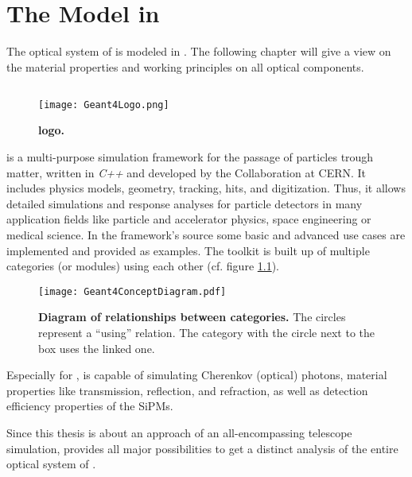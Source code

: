 \chapter{The \iceact Model in \geant}\label{chap:iceact_model}

The optical system of \iceact is modeled in \geant. The following chapter will give a view on the material properties and working principles on all optical components.

\section{\geant}

\begin{wrapfigure}{r}{0.5\textwidth}
	\centering
	\texttt{[image: Geant4Logo.png]}
	\caption[\geant logo]{\textbf{\geant logo.} \cite{geant4:logo}}	
\end{wrapfigure}
\geant is a multi-purpose simulation framework for the passage of particles trough matter, written in \textit{C++} and developed by the \geant Collaboration at CERN. It includes physics models, geometry, tracking, hits, and digitization. Thus, it allows detailed simulations and response analyses for particle detectors in many application fields like particle and accelerator physics, space engineering or medical science. In the framework's source some basic and advanced use cases are implemented and provided as examples. The toolkit is built up of multiple categories (or modules) using each other (cf. figure \ref{geant4:categories}).~\cite{geant4}

\begin{figure}[H]
	\centering
	\texttt{[image: Geant4ConceptDiagram.pdf]}
	\caption[\geant category diagram]{\textbf{Diagram of relationships between \geant categories.} \cite[adapted]{geant4} The circles represent a \enquote{using} relation. The category with the circle next to the box uses the linked one.}	
	\label{geant4:categories}
\end{figure}

Especially for \iceact, \geant is capable of simulating Cherenkov (optical) photons, material properties like transmission, reflection, and refraction, as well as detection efficiency properties of the SiPMs.

Since this thesis is about an approach of an all-encompassing telescope simulation, \geant provides all major possibilities to get a distinct analysis of the entire optical system of \iceact.

